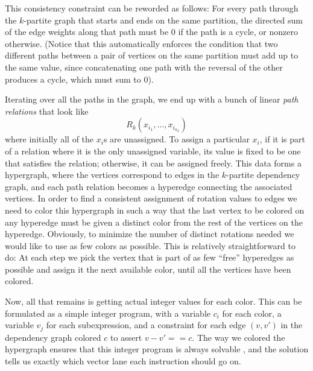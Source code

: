 This consistency constraint can be reworded as follows: For every path through the $k$-partite graph that starts and ends on the same partition, the directed sum of the edge weights along that path must be 0 if the path is a cycle, or nonzero otherwise.
(Notice that this automatically enforces the condition that two different paths between a pair of vertices on the same partition must add up to the same value, since concatenating one path with the reversal of the other produces a cycle, which must sum to 0).

Iterating over all the paths in the graph, we end up with a bunch of linear {\em path relations} that look like $$R_k(x_{i_1}, \dots, x_{i_{n_k}})$$ where initially all of the $x_i$s are unassigned.
To assign a particular $x_i$, if it is part of a relation where it is the only unassigned variable, its value is fixed to be one that satisfies the relation; otherwise, it can be assigned freely.
This data forms a hypergraph, where the vertices correspond to edges in the $k$-partite dependency graph, and each path relation becomes a hyperedge connecting the associated vertices.
In order to find a consistent assignment of rotation values to edges we need to color this hypergraph in such a way that the last vertex to be colored on any hyperedge must be given a distinct color from the rest of the vertices on the hyperedge.
Obviously, to minimize the number of distinct rotations needed we would like to use as few colors as possible.
This is relatively straightforward to do: At each step we pick the vertex that is part of as few ``free'' hyperedges as possible and assign it the next available color, until all the vertices have been colored.

Now, all that remains is getting actual integer values for each color. 
This can be formulated as a simple integer program, with a variable $c_i$ for each color, a variable  $v_j$ for each subexpression, and a constraint for each edge $(v, v')$ in the dependency graph colored $c$ to assert $v - v' == c$.
The way we colored the hypergraph ensures that this integer program is always solvable , and the solution tells us exactly which vector lane each instruction should go on.

